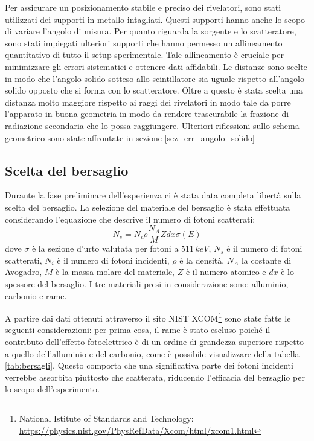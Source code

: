 Per assicurare un posizionamento stabile e preciso dei rivelatori, sono stati utilizzati dei supporti in metallo intagliati. Questi supporti hanno anche lo scopo di variare l'angolo di misura. Per quanto riguarda la sorgente e lo scatteratore, sono stati impiegati ulteriori supporti che hanno permesso un allineamento quantitativo di tutto il setup sperimentale. Tale allineamento è cruciale per minimizzare gli errori sistematici e ottenere dati affidabili. Le distanze sono scelte in modo che l'angolo solido sotteso allo scintillatore sia uguale rispetto all'angolo solido opposto che si forma con lo scatteratore. Oltre a questo è stata scelta una distanza molto maggiore rispetto ai raggi dei rivelatori in modo tale da porre l'apparato in buona geometria in modo da rendere trascurabile la frazione di radiazione secondaria che lo possa raggiungere. Ulteriori riflessioni sullo schema geometrico sono state affrontate in sezione \ref{sez_err_angolo_solido}
\subsection{Scelta del bersaglio}
Durante la fase preliminare dell'esperienza ci è stata data completa libertà sulla scelta del bersaglio. La selezione del materiale del bersaglio è stata effettuata considerando l'equazione che descrive il numero di fotoni scatterati:
\begin{equation}
     N_s = N_i \rho \frac{N_A}{M} Z dx \sigma(E)
     \label{eq:N_s}
\end{equation}
dove $\sigma$ è la sezione d'urto valutata per fotoni a $511\,\unit{keV}$, $N_s$ è il numero di fotoni scatterati, $N_i$ è il numero di fotoni incidenti, $\rho$ è la densità, $N_A$ la costante di Avogadro, $M$ è la massa molare del materiale, $Z$ è il numero atomico e $dx$ è lo spessore del bersaglio. I tre materiali presi in considerazione sono: alluminio, carbonio e rame.

A partire dai dati ottenuti attraverso il sito NIST XCOM\footnote{National Istitute of Standards and Technology: \url{https://physics.nist.gov/PhysRefData/Xcom/html/xcom1.html}} sono state fatte le seguenti considerazioni: per prima cosa, il rame è stato escluso poiché il contributo dell'effetto fotoelettrico è di un ordine di grandezza superiore rispetto a quello dell'alluminio e del carbonio, come è possibile visualizzare della tabella \ref{tab:bersagli}. Questo comporta che una significativa parte dei fotoni incidenti verrebbe assorbita piuttosto che scatterata, riducendo l'efficacia del bersaglio per lo scopo dell'esperimento.

